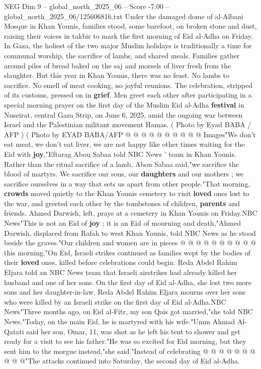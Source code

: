 \begin{textsample}{NEG Dim 9 – global\_north\_2025\_06 – Score -7.00 – global\_north\_2025\_06/125606816.txt}  \label{ex:f9_neg_100}
Under the damaged dome of al-Albani Mosque in Khan Younis, families stood, some barefoot, on broken stone and dust, raising their voices in takbir to mark the first morning of Eid al-Adha on Friday.
In Gaza, the holiest of the two major Muslim holidays is traditionally a time for communal worship, the sacrifice of lambs, and shared meals.
Families gather around piles of bread baked on the saj and morsels of liver fresh from the slaughter.
But this year in Khan Younis, there was no feast.
No lambs to sacrifice.
No smell of meat cooking, no joyful reunions.
The celebration, stripped of its customs, pressed on in \textbf{grief}.
Men greet each other after participating in a special morning prayer on the first day of the Muslim Eid al-Adha \textbf{festival} in Nuseirat, central Gaza Strip, on June 6, 2025, amid the ongoing war between Israel and the Palestinian militant movement Hamas. ( Photo by Eyad BABA / AFP ) ( Photo by EYAD BABA/AFP @ @ @ @ @ @ @ @ @ @ Images"We don't eat meat, we don't eat liver, we are not happy like other times waiting for the Eid with \textbf{joy},"Eftarag Abou Sabaa told NBC News ' team in Khan Younis.
Rather than the ritual sacrifice of a lamb, Abou Sabaa said,"we sacrifice the blood of martyrs.
We sacrifice our sons, our \textbf{daughters} and our mothers ; we sacrifice ourselves in a way that sets us apart from other people."That morning, \textbf{crowds} moved quietly to the Khan Younis cemetery to visit \textbf{loved} ones lost to the war, and greeted each other by the tombstones of children, \textbf{parents} and friends.
Ahmed Darwish, left, prays at a cemetery in Khan Younis on Friday.NBC News"This is not an Eid of \textbf{joy} ; it is an Eid of mourning and death,"Ahmed Darwish, displaced from Rafah to west Khan Younis, told NBC News as he stood beside the graves."Our children and women are in pieces @ @ @ @ @ @ @ @ @ @ this morning."On Eid, Israeli strikes continued as families wept by the bodies of their \textbf{loved} ones, killed before celebrations could begin.
Reda Abdel Rahim Eljara told an NBC News team that Israeli airstrikes had already killed her husband and one of her sons.
On the first day of Eid al-Adha, she lost two more sons and her daughter-in-law.
Reda Abdel Rahim Eljara mourns over her sons who were killed by an Israeli strike on the first day of Eid al-Adha.NBC News"Three months ago, on Eid al-Fitr, my son Qais got married,"she told NBC News."Today, on the main Eid, he is martyred with his wife."Umm Ahmad Al-Qatati said her son, Omar, 11, was shot as he left his tent to shower and get ready for a visit to see his father."He was so excited for Eid morning, but they sent him to the morgue instead,"she said."Instead of celebrating @ @ @ @ @ @ @ @ @ @"The attacks continued into Saturday, the second day of Eid al-Adha.

\end{textsample}
